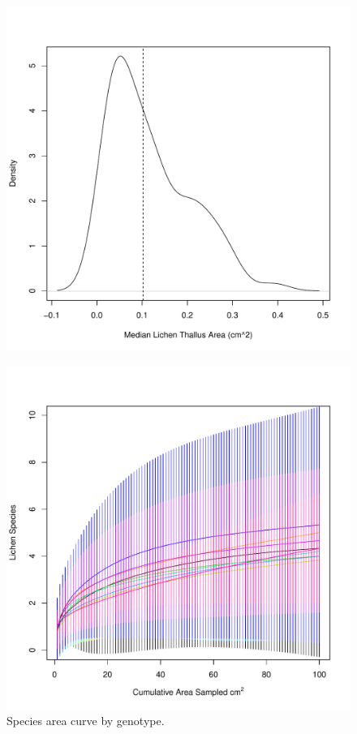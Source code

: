 \documentclass[11pt,twocolumn,twoside,lineno]{pnas-new}
\begin{document}
\begin{figure}[ht]
\centering
\includegraphics[width=\linewidth]{xg_size.pdf}
\caption{}
\label{fig:xg_size_app}
\end{figure}

\begin{figure}[ht]
\centering
\includegraphics[width=\linewidth]{spac_geno.pdf}
\caption{Species area curve by genotype.}
\label{fig:spac_geno_app}
\end{figure}
\end{document}
